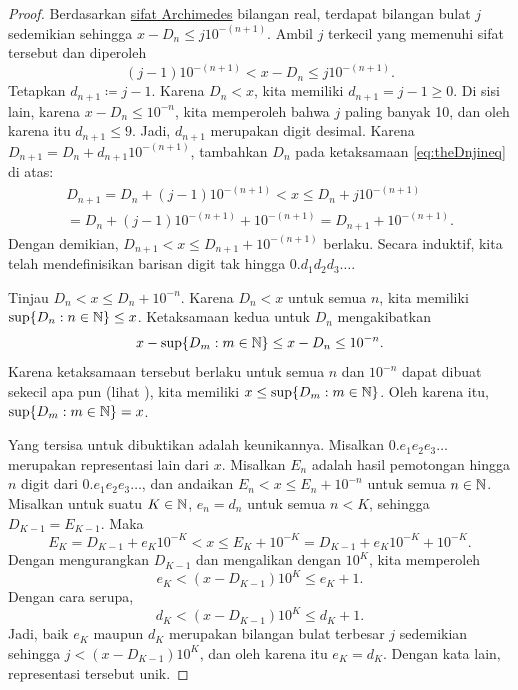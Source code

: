\begin{proof}
Berdasarkan
\hyperref[thm:arch:i]{sifat Archimedes} bilangan real,
terdapat bilangan bulat $j$ sedemikian sehingga
$x-D_n \leq j {10}^{-(n+1)}$. Ambil $j$ terkecil yang memenuhi sifat tersebut dan diperoleh
\begin{equation} \label{eq:theDnjineq}
(j-1){10}^{-(n+1)} < x-D_n \leq j {10}^{-(n+1)} .
\end{equation}
Tetapkan $d_{n+1} \coloneqq j-1$.
Karena $D_n < x$,
kita memiliki $d_{n+1} = j-1 \geq 0$. Di sisi lain, karena
$x-D_n \leq {10}^{-n}$, kita memperoleh bahwa
$j$ paling banyak 10, dan oleh karena itu $d_{n+1} \leq 9$.
Jadi, $d_{n+1}$ merupakan
digit desimal.
Karena $D_{n+1} = D_n + d_{n+1} {10}^{-(n+1)}$,
tambahkan $D_n$ pada ketaksamaan
\eqref{eq:theDnjineq} di atas:
\begin{multline*}
D_{n+1} = D_n + (j-1){10}^{-(n+1)} < x
\leq
D_n + j {10}^{-(n+1)} \\
=
D_n + (j-1) {10}^{-(n+1)} +
{10}^{-(n+1)} = D_{n+1} + {10}^{-(n+1)} .
\end{multline*}
Dengan demikian,
$D_{n+1} < x \leq D_{n+1} + {10}^{-(n+1)}$ berlaku.
Secara induktif, kita telah
mendefinisikan barisan digit tak hingga $0.d_1d_2d_3\ldots$.

Tinjau $D_{n} < x \leq D_{n} + {10}^{-n}$.
Karena $D_n < x$ untuk semua $n$, kita memiliki
$\sup \{ D_n : n \in {\mathbb{N}} \} \leq x$.
Ketaksamaan kedua untuk $D_n$ mengakibatkan
\begin{equation*}
x - \sup \{ D_m : m \in {\mathbb{N}} \}
\leq
x - D_n \leq 10^{-n} .
\end{equation*}
Karena ketaksamaan tersebut berlaku untuk semua $n$ dan
${10}^{-n}$ dapat dibuat sekecil apa pun
(lihat ),
kita memiliki $x \leq \sup \{ D_m : m \in {\mathbb{N}} \}$.
Oleh karena itu, $\sup \{ D_m : m \in {\mathbb{N}} \} = x$.

Yang tersisa untuk dibuktikan adalah keunikannya.
Misalkan $0.e_1e_2e_3\ldots$ merupakan representasi lain dari $x$.
Misalkan $E_n$ adalah hasil pemotongan hingga $n$ digit dari $0.e_1e_2e_3\ldots$, dan andaikan
$E_n < x \leq E_n + {10}^{-n}$ untuk semua $n \in {\mathbb{N}}$.
Misalkan untuk suatu $K \in {\mathbb{N}}$, $e_n = d_n$ untuk semua $n < K$, sehingga
$D_{K-1} = E_{K-1}$. Maka
\begin{equation*}
E_K = D_{K-1} + e_K{10}^{-K} < x \leq E_K + {10}^{-K} = D_{K-1} +
e_K{10}^{-K} + {10}^{-K} .
\end{equation*}
Dengan mengurangkan $D_{K-1}$ dan mengalikan dengan ${10}^{K}$, kita memperoleh
\begin{equation*}
e_K < (x - D_{K-1}){10}^K \leq e_K + 1 .
\end{equation*}
Dengan cara serupa,
\begin{equation*}
d_K < (x - D_{K-1}){10}^K \leq d_K + 1 .
\end{equation*}
Jadi, baik $e_K$ maupun $d_K$ merupakan bilangan bulat terbesar $j$
sedemikian sehingga $j < (x - D_{K-1}){10}^K$, dan oleh karena itu $e_K = d_K$.
Dengan kata lain, representasi tersebut unik.
\end{proof}

